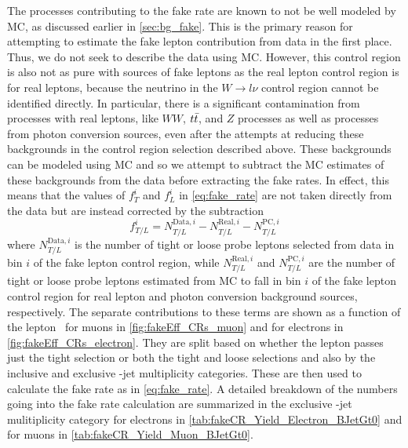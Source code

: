 The processes contributing to the fake rate are known
to not be well modeled by MC, as discussed earlier in \sec\ref{sec:bg_fake}.
This is the primary reason for attempting to estimate the fake
lepton contribution from data in the first place. Thus,
we do not seek to describe the data using MC.
However, this control region is also not as pure with sources
of fake leptons as the real lepton control region is for real leptons,
because the neutrino in the $W\rightarrow l\nu$ control region
cannot be identified directly.
In particular, there is a significant contamination from processes
with real leptons, like $WW$, $t\bar{t}$, and $Z$ processes as well
as processes from photon conversion sources, even after the attempts
at reducing these backgrounds in the control region selection described above.
These backgrounds can be modeled using MC and so we attempt to subtract the
MC estimates of these backgrounds from the data before extracting the fake
rates. In effect, this means that the values of $f_{T}^{i}$ and
$f_{L}^i$ in \eqn\eqref{eq:fake_rate} are not taken directly from the
data but are instead corrected by the subtraction
\begin{equation}
\label{eq:fake_num_breakdown}
f_{T/L}^{i} = 
N^{\textrm{Data},i}_{T/L} 
- N^{\textrm{Real},i}_{T/L}
- N^{\textrm{PC},i}_{T/L}
\end{equation}
where $N^{\textrm{Data},i}_{T/L}$ is the number of tight or loose
probe leptons selected from data in bin $i$ of the fake lepton control region,
while $N^{\textrm{Real},i}_{T/L}$  and $N^{\textrm{PC},i}_{T/L}$
are the number of tight or loose probe leptons estimated from MC
to fall in bin $i$ of the fake lepton control region for real
lepton and photon conversion background sources, respectively.
The separate contributions to these terms are shown as a function
of the lepton \pt~for muons in \fig\ref{fig:fakeEff_CRs_muon} and for electrons
in \fig\ref{fig:fakeEff_CRs_electron}. They are split based on whether the lepton
passes just the tight selection or both the tight and loose selections
and also by the inclusive and exclusive \bee-jet multiplicity categories.
These are then used to calculate the fake rate as in \eqn\eqref{eq:fake_rate}.
A detailed breakdown of the numbers going into the fake rate calculation
are summarized in the exclusive \bee-jet mulitiplicity category for 
electrons in \tab\ref{tab:fakeCR_Yield_Electron_BJetGt0}
and for muons in \tab\ref{tab:fakeCR_Yield_Muon_BJetGt0}.


